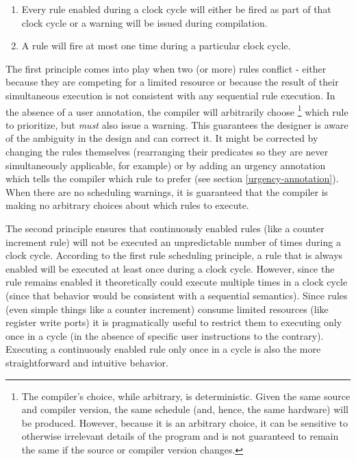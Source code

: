 \documentclass[twoside,letterpaper]{article}
\begin{document}
\begin{enumerate} 
\item Every rule enabled during a clock cycle will either be fired as part of
that clock cycle or a warning will be issued during compilation.
\item A rule will fire at most one time during a particular clock cycle.
\end{enumerate}

The first principle comes into play when two (or more) rules conflict - 
either because they are competing for a limited resource or because the result 
of their simultaneous execution is not consistent with any sequential rule 
execution. In the absence of a user annotation, the compiler will arbitrarily 
choose \footnote{The compiler's choice, while arbitrary, is deterministic. 
Given the same source and compiler version, the same schedule 
(and, hence, the same hardware) will be produced. However, because 
it is an arbitrary choice, it can be sensitive to otherwise irrelevant 
details of the program and is not guaranteed to remain the same if the 
source or compiler version changes.} 
which rule to prioritize, but \emph{must} also issue a warning. This guarantees 
the designer is aware of the ambiguity in the design and can correct it. It
might be corrected by changing the rules themselves (rearranging their predicates 
so they are never simultaneously applicable, for example) or by adding an urgency 
annotation which tells the compiler which rule to prefer (see section 
\ref{urgency-annotation}). When there are no scheduling warnings, it is 
guaranteed that the compiler is making no arbitrary choices about which rules to
execute.

The second principle ensures that continuously enabled rules (like a counter
increment rule) will not be executed an unpredictable number of times during
a clock cycle. According to the first rule scheduling principle, a rule that
is always enabled will be executed at least once during a clock cycle. However,
since the rule remains enabled it theoretically could execute multiple times 
in a clock cycle (since that behavior would be consistent with a sequential
semantics). Since rules (even simple things like a counter increment) consume
limited resources (like register write ports) it is pragmatically useful to 
restrict them to executing only once in a cycle (in the absence of specific
user instructions to the contrary). Executing a continuously enabled rule
only once in a cycle is also the more straightforward and intuitive behavior.
\end{document}
